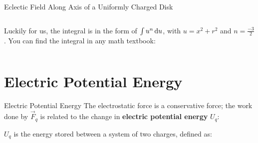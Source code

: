 \documentclass[12pt,aspectratio=169]{beamer}
\begin{document}
\begin{frame}{Eclectic Field Along Axis of a Uniformly Charged Disk}
  \begin{columns}
    
    Luckily for us, the integral is in the form of $\int u^n\dl u$,
    with $u=x^2+r^2$ and $n=\frac{-3}2$. You can find the integral in any math
    textbook:

  \end{columns}
\end{frame}



\section{Electric Potential Energy}

\begin{frame}{Electric Potential Energy}
  The electrostatic force is a conservative force; the work done by $\vec F_q$
  is related to the change in \textbf{electric potential energy} $U_q$:
  

  $U_q$ is the energy stored between a system of two charges, defined as:
    
\end{frame}
\end{document}
